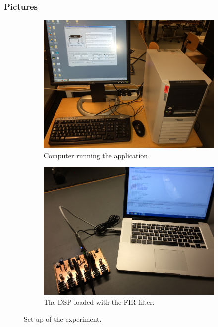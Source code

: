 \subsubsection{Pictures}
\begin{figure}[H]
	\centering
	\begin{subfigure}[b]{.495\textwidth}
		\centering
		\includegraphics[width=\textwidth]{../Journal/Experiments/Figures/Fullsetup1}
		\caption{Computer running the application.}
		\label{fig:FIRFullSetup1}
	\end{subfigure} 
	\begin{subfigure}[b]{.495\textwidth}
		\centering
		\includegraphics[width=\textwidth]{../Journal/Experiments/Figures/Fullsetup2}
		\caption{The DSP loaded with the FIR-filter.}
		\label{fig:FIRFullSetup2}
	\end{subfigure}
	\caption{Set-up of the experiment.}
		\label{fig:FIRFullSetup}
\end{figure}


